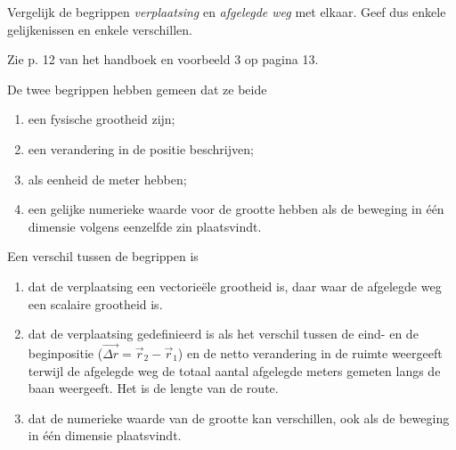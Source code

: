 
\begin{exercise}




 Vergelijk de begrippen \emph{verplaatsing} en \emph{afgelegde weg} met elkaar. Geef dus enkele gelijkenissen en enkele verschillen. 
\begin{oplossing}
Zie p. 12 van het handboek en voorbeeld 3 op pagina 13.

De twee begrippen hebben gemeen dat ze beide 
\begin{enumerate}
	\item een fysische grootheid zijn;
	\item een verandering in de positie beschrijven;
	\item als eenheid de meter hebben;
	\item een gelijke numerieke waarde voor de grootte hebben als de beweging in \'e\'en dimensie volgens eenzelfde zin plaatsvindt.
\end{enumerate}

Een verschil tussen de begrippen is

\begin{enumerate}
	\item dat de verplaatsing een vectorie\"ele grootheid is, daar waar de afgelegde weg een scalaire grootheid is. 
	\item dat de verplaatsing gedefinieerd is als het verschil tussen de eind- en de beginpositie ($\vec{\Delta r}=\vec{r}_2-\vec{r}_1$) en de netto verandering in de ruimte weergeeft terwijl de afgelegde weg de totaal aantal afgelegde meters gemeten langs de baan weergeeft. Het is de lengte van de route.
	\item dat de numerieke waarde van de grootte kan verschillen, ook als de beweging in \'e\'en dimensie plaatsvindt.
\end{enumerate}

\end{oplossing}

\end{exercise}
